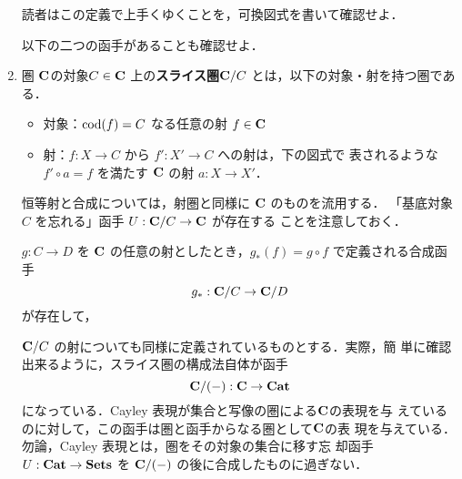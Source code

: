 \begin{enumerate}
       読者はこの定義で上手くゆくことを，可換図式を書いて確認せよ．

       以下の二つの函手があることも確認せよ．
       \begin{center}
       \end{center}
 \item 圏 ${\bf C}$の対象$C \in {\bf C}$ 上の{\bfseries スライス圏}${\bf C}/C$
       とは，以下の対象・射を持つ圏である．
       \begin{itemize}
	\item 対象：$\mathrm{cod}(f) = C$ なる任意の射 $f \in {\bf C}$
	\item 射：$f: X \to C$ から $f': X' \to C$ への射は，下の図式で
	      表されるような$f' \circ a = f$ を満たす ${\bf C}$ の射 $a :
	      X \to X'$．
	      \begin{center}
	      \end{center}
       \end{itemize}
       恒等射と合成については，射圏と同様に ${\bf C}$ のものを流用する．
       「基底対象 $C$ を忘れる」函手 $U: {\bf C}/ C \to {\bf C}$ が存在する
       ことを注意しておく．

       $g: C \to D$ を ${\bf C}$ の任意の射としたとき，$g_*(f) = g \circ
       f$ で定義される合成函手
       \[
	g_*: {\bf C}/C \to {\bf C}/D
       \]
       が存在して，
       \begin{center}
       \end{center}
       ${\bf C}/C$ の射についても同様に定義されているものとする．実際，簡
       単に確認出来るように，スライス圏の構成法自体が函手
       \[
	{\bf C/(-)} : {\bf C} \to \mathbf{Cat}
       \]
       になっている．Cayley 表現が集合と写像の圏による${\bf C}$の表現を与
       えているのに対して，この函手は圏と函手からなる圏として${\bf C}$の表
       現を与えている．勿論，Cayley 表現とは，圏をその対象の集合に移す忘
       却函手
       $U: \mathbf{Cat} \to \mathbf{Sets}$ を ${\bf C}/(-)$ の後に合成したものに過ぎない．


\end{enumerate}
